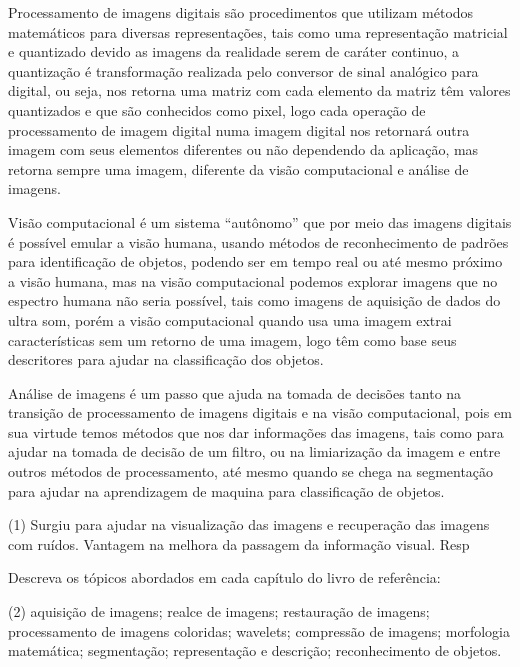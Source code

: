 \documentclass[12pt,a4paper]{article}
\begin{document}
\begin{solution}
    Processamento de imagens digitais são procedimentos que utilizam métodos
    matemáticos para diversas representações, tais como uma representação
    matricial e quantizado devido as imagens da realidade serem de caráter
    continuo, a quantização é transformação realizada pelo conversor de sinal
    analógico para digital, ou seja, nos retorna uma matriz com cada elemento da
    matriz têm valores quantizados e que são conhecidos como pixel, logo cada
    operação de processamento de imagem digital numa imagem digital nos
    retornará outra imagem com seus elementos diferentes ou não dependendo da
    aplicação, mas retorna sempre uma imagem, diferente da visão computacional e
    análise de imagens.

    Visão computacional é um sistema ``autônomo'' que por meio das imagens
    digitais é possível emular a visão humana, usando métodos de reconhecimento
    de padrões para identificação de objetos, podendo ser em tempo real ou até
    mesmo próximo a visão humana, mas na visão computacional podemos explorar
    imagens que no espectro humana não seria possível, tais como imagens de
    aquisição de dados do ultra som, porém a visão computacional quando usa uma
    imagem extrai características sem um retorno de uma imagem, logo têm como
    base seus descritores para ajudar na classificação dos objetos. 

    Análise de imagens é um passo que ajuda na tomada de decisões tanto na
    transição de processamento de imagens digitais e na visão computacional,
    pois em sua virtude temos métodos que nos dar informações das imagens, tais
    como para ajudar na tomada de decisão de um filtro, ou na limiarização da
    imagem e entre outros métodos de processamento, até mesmo quando se chega na
    segmentação para ajudar na aprendizagem de maquina para classificação de
    objetos.

    \begin{tasks}(1)
        \task Surgiu para ajudar na visualização das imagens e recuperação das
        imagens com ruídos.
        \task Vantagem na melhora da passagem da informação visual.
        \task Resp
    \end{tasks}
\end{solution}


\begin{question}{0.33}
    Descreva os tópicos abordados em cada capítulo do livro de referência:
    \begin{tasks}(2)
        \task aquisição de imagens;
        \task realce de imagens;
        \task restauração de imagens;
        \task processamento de imagens coloridas;
        \task wavelets;
        \task compressão de imagens;
        \task morfologia matemática;
        \task segmentação;
        \task representação e descrição;
        \task reconhecimento de objetos.
    \end{tasks}
\end{question}
\end{document}

